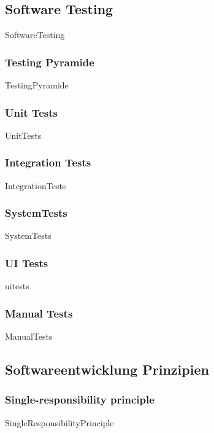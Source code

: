 \documentclass{article}
\begin{document}
    \subsection{Software Testing}
        {SoftwareTesting}

        \subsubsection{Testing Pyramide}
            {TestingPyramide}
        
        \subsubsection{Unit Tests}
            {UnitTests}
        
        \subsubsection{Integration Tests}
            {IntegrationTests}

        \subsubsection{SystemTests}
            {SystemTests}

        \subsubsection{UI Tests}
            {uitests}

        \subsubsection{Manual Tests}
            {ManualTests}

    \subsection{Softwareentwicklung Prinzipien}

        \subsubsection{Single-responsibility principle}
        \label{kap:SRP}
            {SingleResponsibilityPrinciple}
        
\end{document}
